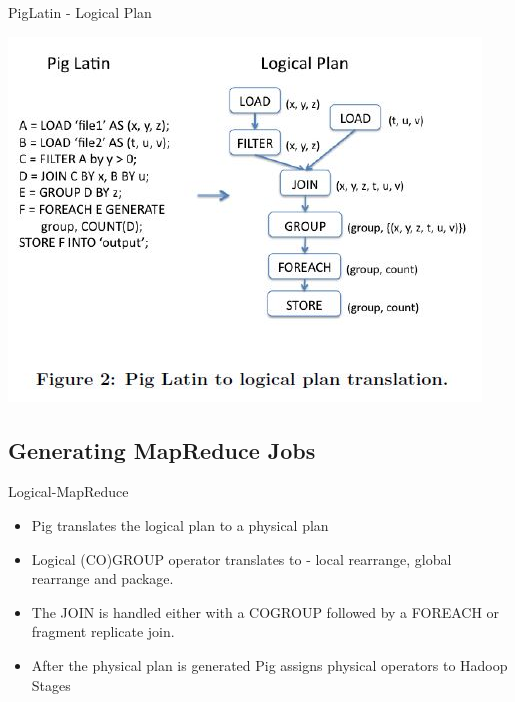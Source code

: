 \begin{frame}{PigLatin - Logical Plan}
\centerline{\includegraphics[scale=0.55]{Images/PigLatin.JPG}}
\let\thefootnote\relax{}
\end{frame}

\subsection{Generating MapReduce Jobs}
\begin{frame}{Logical-MapReduce}
\begin{itemize}
	\item Pig translates the logical plan to a physical plan
	\item Logical (CO)GROUP operator translates to - local rearrange, global rearrange and package.
	\item The JOIN is handled either with a COGROUP followed by a FOREACH or fragment replicate join.
	\item After the physical plan is generated Pig assigns physical operators to Hadoop Stages
\end{itemize}
\end{frame}

